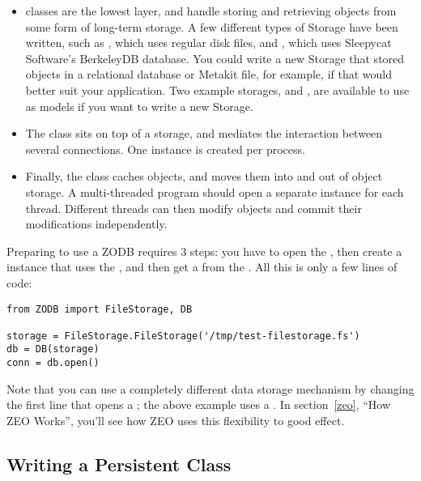 \begin{itemize}
 \item {} classes are the lowest layer, and handle
 storing and retrieving objects from some form of long-term storage.
 A few different types of Storage have been written, such as
 , which uses regular disk files, and
 , which uses Sleepycat Software's BerkeleyDB
 database.  You could write a new Storage that stored objects in a
 relational database or Metakit file, for example, if that would
 better suit your application.  Two example storages,
  and , are available to use
 as models if you want to write a new Storage.

 \item The  class sits on top of a storage, and mediates the
 interaction between several connections.  One  instance is
 created per process.

 \item Finally, the  class caches objects, and moves
 them into and out of object storage.  A multi-threaded program should
 open a separate  instance for each thread.
 Different threads can then modify objects and commit their
 modifications independently.

\end{itemize}

Preparing to use a ZODB requires 3 steps: you have to open the
, then create a  instance that uses the
, and then get a  from the .  All this is only a few lines of code:

\begin{verbatim}
from ZODB import FileStorage, DB

storage = FileStorage.FileStorage('/tmp/test-filestorage.fs')
db = DB(storage)
conn = db.open()
\end{verbatim}

Note that you can use a completely different data storage mechanism by
changing the first line that opens a ; the above example uses a
.  In section~\ref{zeo}, ``How ZEO Works'',
you'll see how ZEO uses this flexibility to good effect.

\subsection{Writing a Persistent Class}

